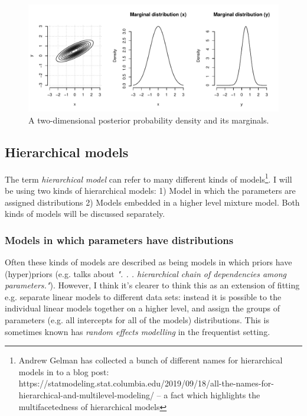 \documentclass{article}\usepackage{knitr}
\begin{document}
\begin{figure}
\centering
\begin{knitrout}
\color{fgcolor}
\includegraphics[width=\maxwidth]{figure/unnamed-chunk-14-1} 
\end{knitrout}
\caption{A two-dimensional posterior probability density and its marginals. }
\label{fig:marginals}
\end{figure}

\subsection{Hierarchical models}
\label{sec:hierarchical_models}

The term \textit{hierarchical model} can refer to many different kinds of models\footnote{Andrew Gelman has collected a bunch of different names for hierarchical models in to a blog post: https://statmodeling.stat.columbia.edu/2019/09/18/all-the-names-for-hierarchical-and-multilevel-modeling/ -- a fact which highlights the multifacetedness of hierarchical models}. I will be using two kinds of hierarchical models: 1) Model in which the parameters are assigned distributions 2) Models embedded in a higher level mixture model. Both kinds of models will be discussed separately.

\subsubsection*{Models in which parameters have distributions}

Often these kinds of models are described as being models in which priors have (hyper)priors (e.g. \citet[p. 225]{kruschke2015} talks about \textit{". . . hierarchical chain of dependencies among parameters."}). However, I think it's clearer to think this as an extension of fitting e.g. separate linear models to different data sets: instead it is possible to the individual linear models together on a higher level, and assign the groups of parameters (e.g. all intercepts for all of the models) distributions. This is sometimes known has \textit{random effects modelling} in the frequentist setting.
\end{document}
